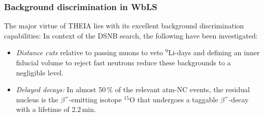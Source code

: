 \subsubsection{Background discrimination in WbLS} 

The major virtue of THEIA lies with its excellent background discrimination capabilities: In context of the DSNB search, the following have been investigated:

\begin{itemize}
\item {\it Distance cuts} relative to passing muons to veto $^9$Li-days and defining an inner fiducial volume to reject fast neutrons reduce these backgrounds to a negligible level.
\item {\it Delayed decays:} In almost 50\,\% of the relevant atm-NC events, the residual nucleus is the $\beta^+$-emitting isotope $^{15}$O that undergoes a taggable $\beta^+$-decay with a lifetime of 2.2\,min.


\end{itemize}

